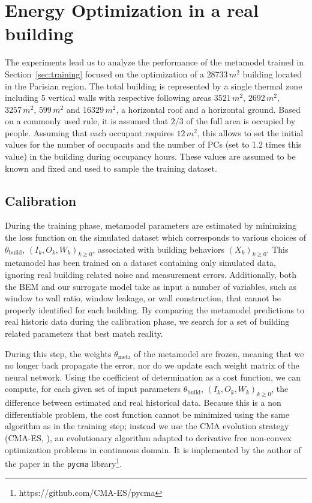 \documentclass[12pt]{article}
\begin{document}
\section{Energy Optimization in a real building}
\label{sec:calib:optim}
The experiments lead us to analyze the performance of the metamodel trained in Section~\ref{sec:training} focused on the optimization of a $28733\, m^2$ building located in the Parisian region. The total building is represented by a single thermal zone including  5 vertical walls with respective following areas $3521\, m^2$, $2692\, m^2$, $3257\, m^2$, $599\, m^2$ and $16329\, m^2$, a horizontal roof and a horizontal ground. Based on a commonly used rule, it is assumed that $2/3$ of the full area is occupied by people. Assuming that each occupant requires $12\, m^2$, this allows to set the initial values for the number of occupants and the number of PCs (set to 1.2 times this value) in the building during occupancy hours. These values are assumed to be known and fixed and used to sample the training dataset.

\subsection{Calibration}
During the training phase, metamodel parameters are estimated by minimizing the loss function on the simulated dataset which corresponds to various choices of $\theta_{\mathrm{build}}$, $(I_k,O_k,W_k)_{k\geqslant 0}$, associated with building behaviors $(X_k)_{k\geqslant 0}$. This metamodel has been trained on a dataset containing only simulated data,  ignoring real building related noise and measurement errors. Additionally, both the BEM and our surrogate model take as input a number of variables, such as window to wall ratio, window leakage, or wall construction, that cannot be properly identified for each building. By comparing the metamodel predictions to real historic data during the calibration phase, we search for a set of building related parameters that best match reality.

During this step, the weights $\theta_{\mathrm{meta}}$ of the metamodel are frozen, meaning that we no longer back propagate the error, nor do we update each weight matrix of the neural network. Using the coefficient of determination as a cost function, we can compute, for each given set of input parameters $\theta_{\mathrm{build}}$, $(I_k,O_k,W_k)_{k\geqslant 0}$, the difference between estimated and real historical data. Because this is a non differentiable problem, the cost function cannot be minimized using the same algorithm as in the training step; instead we use the CMA evolution strategy (CMA-ES, \cite{Hansen2016TheCE}), an evolutionary algorithm adapted to derivative free non-convex optimization problems in continuous domain. It is implemented by the author of the paper in the \texttt{pycma} library\footnote{https://github.com/CMA-ES/pycma}.
\end{document}
